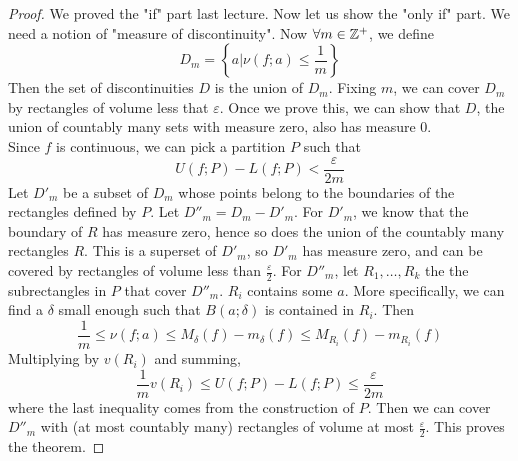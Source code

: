 \documentclass[12pt]{article}
\begin{document}
\begin{proof}
    We proved the "if" part last lecture. Now let us show the "only if" part. We need a notion of "measure of discontinuity". Now $\forall m \in \mathbb{Z}^+$, we define
    $$D_m = \left\{a|\nu(f;a) \leq \frac{1}{m}\right\}$$
    Then the set of discontinuities $D$ is the union of $D_m$. Fixing $m$, we can cover $D_m$ by rectangles of volume less that $\varepsilon$. Once we prove this, we can show that $D$, the union of countably many sets with measure zero, also has measure 0. \\
    Since $f$ is continuous, we can pick a partition $P$ such that
    $$U(f;P) - L(f;P) < \frac{\varepsilon}{2m}$$
    Let $D'_m$ be a subset of $D_m$ whose points belong to the boundaries of the rectangles defined by $P$. Let $D''_m = D_m - D'_m$. For $D'_m$, we know that the boundary of $R$ has measure zero, hence so does the union of the countably many rectangles $R$. This is a superset of $D'_m$, so $D'_m$ has measure zero, and can be covered by rectangles of volume less than $\frac{\varepsilon}{2}$. For $D''_m$, let $R_1, \dots, R_k$ the the subrectangles in $P$ that cover $D''_m$. $R_i$ contains some $a$. More specifically, we can find a $\delta$ small enough such that $B(a;\delta)$ is contained in $R_i$. Then
    $$\frac{1}{m} \leq \nu(f;a) \leq M_\delta(f) - m_\delta(f) \leq M_{R_i}(f) - m_{R_i}(f)$$
    Multiplying by $v(R_i)$ and summing,
    $$\frac{1}{m} v(R_i) \leq U(f;P) - L(f;P) \leq \frac{\varepsilon}{2m}$$
    where the last inequality comes from the construction of $P$.
    Then we can cover $D''_m$ with (at most countably many) rectangles of volume at most $\frac{\varepsilon}{2}$. This proves the theorem.
\end{proof}
\end{document}
